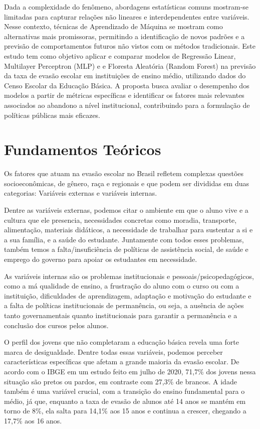 \documentclass[english, spanish, brazilian]{RBIEarticle} %
\begin{document}
Dada a complexidade do fenômeno, abordagens estatísticas comuns mostram-se limitadas para capturar relações não lineares e interdependentes entre variáveis. Nesse contexto, técnicas de Aprendizado de Máquina se mostram como alternativas mais promissoras, permitindo a identificação de novos padrões e a previsão de comportamentos futuros não vistos com os métodos tradicionais. Este estudo tem como objetivo aplicar e comparar modelos de Regressão Linear, Multilayer Perceptron (MLP) e e Floresta Aleatória (Random Forest) na previsão da taxa de evasão escolar em instituições de ensino médio, utilizando dados do Censo Escolar da Educação Básica. A proposta busca avaliar o desempenho dos modelos a partir de métricas específicas e identificar os fatores mais relevantes associados ao abandono a nível institucional, contribuindo para a formulação de políticas públicas mais eficazes.


\section{Fundamentos Teóricos}
Os fatores que atuam na evasão escolar no Brasil refletem complexas questões socioeconômicas, de gênero, raça e regionais e que podem ser divididas em duas categorias: Variáveis externas e variáveis internas.

Dentre as variáveis externas, podemos citar o ambiente em que o aluno vive e a cultura que ele presencia, necessidades concretas como moradia, transporte, alimentação, materiais didáticos, a necessidade de trabalhar para sustentar a si e a sua família, e a saúde do estudante. Juntamente com todos esses problemas, também temos a falta/insuficiência de políticas de assistência social, de saúde e emprego do governo para apoiar os estudantes em necessidade.

As variáveis internas são os problemas institucionais e pessoais/psicopedagógicos, como a má qualidade de ensino, a frustração do aluno com o curso ou com a instituição, dificuldades de aprendizagem, adaptação e motivação do estudante e a falta de políticas institucionais de permanência, ou seja, a ausência de ações tanto governamentais quanto institucionais para garantir a permanência e a conclusão dos cursos pelos alunos.

O perfil dos jovens que não completaram a educação básica revela uma forte marca de desigualdade. Dentre todas essas variáveis, podemos perceber características específicas que afetam a grande maioria da evasão escolar. De acordo com o IBGE em um estudo feito em julho de 2020, 71,7\% dos jovens nessa situação são pretos ou pardos, em contraste com 27,3\% de brancos. A idade também é uma variável crucial, com a transição do ensino fundamental para o médio, já que, enquanto a taxa de evasão de alunos até 14 anos se mantém em torno de 8\%, ela salta para 14,1\% aos 15 anos e continua a crescer, chegando a 17,7\% aos 16 anos.
\end{document}

